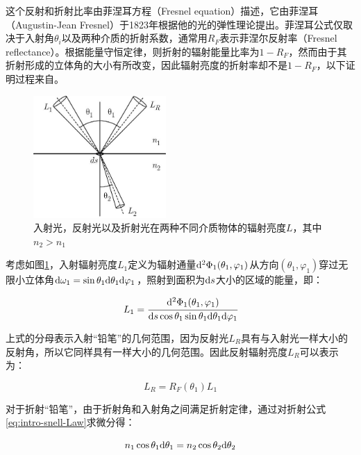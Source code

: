 这个反射和折射比率由菲涅耳方程（Fresnel equation）描述，它由菲涅耳（Augustin-Jean Fresnel）于1823年根据他的光的弹性理论提出。菲涅耳公式仅取决于入射角$\theta_i$以及两种介质的折射系数，通常用$R_F$表示菲涅尔反射率（Fresnel reflectance）。根据能量守恒定律，则折射的辐射能量比率为$1-R_F$，然而由于其折射形成的立体角的大小有所改变，因此辐射亮度的折射率却不是$1-R_F$，以下证明过程来自\cite{a:ReflectionandtransmissionoflightbyaflatinterfaceFresnelsformulae}。

\begin{figure}
	\sidecaption
	\includegraphics[width=0.45\textwidth]{figures/intro/fresnel}
	\caption{入射光，反射光以及折射光在两种不同介质物体的辐射亮度$L$，其中$n_2>n_1$}
	\label{f:intro-fresnel}
\end{figure}

考虑如图\ref{f:intro-fresnel}，入射辐射亮度$L_1$定义为辐射通量${\rm d}^{2}\Phi_1(\theta_1,\varphi_1)$从方向$(\theta_1,\varphi_1)$穿过无限小立体角${\rm d}\omega_1=\sin\theta_1 {\rm d}\theta_1 {\rm d}\varphi_1$，照射到面积为${\rm d}s$大小的区域的能量，即：

\begin{equation}
	L_1= \cfrac{{\rm d}^{2}\Phi_1(\theta_1,\varphi_1)}{{\rm d}s\cos\theta_1 \sin\theta_1 {\rm d}\theta_1 {\rm d}\varphi_1}
\end{equation}

\noindent 上式的分母表示入射“铅笔”的几何范围，因为反射光$L_R$具有与入射光一样大小的反射角，所以它同样具有一样大小的几何范围。因此反射辐射亮度$L_R$可以表示为：

 \begin{equation}
 	L_R=R_F(\theta_1)L_1
 \end{equation}

\noindent 对于折射“铅笔”，由于折射角和入射角之间满足折射定律，通过对折射公式\ref{eq:intro-snell-Law}求微分得：

\begin{equation}\label{eq:intro-snell-Law-diff}
	n_1 \cos\theta_1 {\rm d}\theta_1=n_2 \cos\theta_2 {\rm d}\theta_2
\end{equation}

